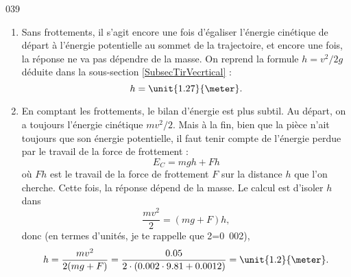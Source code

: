 

\begin{corrige}{039}

\begin{enumerate}

\item Sans frottements, il s'agit encore une fois d'égaliser l'énergie cinétique de départ à l'énergie potentielle au sommet de la trajectoire, et encore une fois, la réponse ne va pas dépendre de la masse. On reprend  la formule $h=v^2/2g$ déduite dans la sous-section \ref{SubsecTirVecrtical} :
\[ 
  h=\unit{1.27}{\meter}.
\]
 \item   En comptant les frottements, le bilan d'énergie est plus subtil. Au départ, on a toujours l'énergie cinétique $mv^2/2$. Mais à la fin, bien que la pièce n'ait toujours que son énergie potentielle, il faut tenir compte de l'énergie perdue par le travail de la force de frottement :
\[ 
  E_C=mgh+Fh
\]
où $Fh$ est le travail de la force de frottement $F$ sur la distance $h$ que l'on cherche. Cette fois, la réponse dépend de la masse. Le calcul est d'isoler $h$ dans
\[ 
  \frac{ mv^2 }{ 2 }=(mg+F)h,
\]
donc (en termes d'unités, je te rappelle que \unit{2}{\gram}=\unit{0.002}{\kilo\gram}),	
\[ 
  h=\frac{ mv^2 }{ 2(mg+F) }=\frac{ 0.05 }{ 2\cdot(0.002\cdot 9.81+0.0012) }=\unit{1.2}{\meter}.
\]
\end{enumerate}

\end{corrige}



